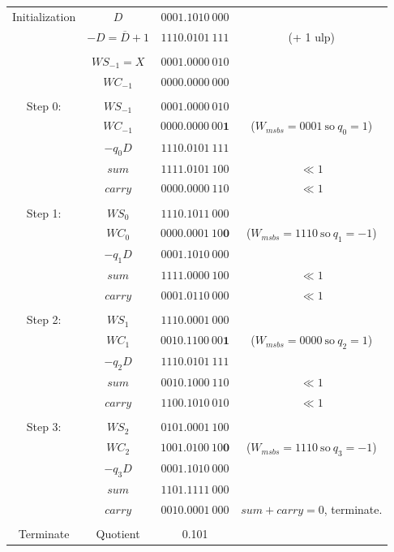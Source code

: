 \documentclass[12pt]{article}
\begin{document}
\begin{center}
\begin{tabular}{cccc}
    Initialization&$D$&$0001.1010\ 000$&\\
    &$-D=\overline{D}+1$&$1110.0101\ 111$&(+ 1 ulp)\\
    &&&\\
    &$WS_{-1}=X$&$0001.0000\ 010$&\\
    &$WC_{-1}$&$0000.0000\ 000$&\\
    \hdashline\\
    Step 0:&$WS_{-1}$&$0001.0000\ 010$&\\
    &$WC_{-1}$&$0000.0000\ 00\mathbf{1}$&($W_{msbs}=0001\ \text{so}\ q_0=1$)\\
    &$-q_0D$&$1110.0101\ 111$&\\
    \cline{2-3}
    &$sum$&$1111.0101\ 100$&$\ll1$\\
    &$carry$&$0000.0000\ 110$&$\ll1$\\
    \hdashline\\
    Step 1:&$WS_0$&$1110.1011\ 000$&\\
    &$WC_0$&$0000.0001\ 10\mathbf{0}$&($W_{msbs}=1110\ \text{so}\ q_1=-1$)\\
    &$-q_1D$&$0001.1010\ 000$&\\
    \cline{2-3}
    &$sum$&$1111.0000\ 100$&$\ll1$\\
    &$carry$&$0001.0110\ 000$&$\ll1$\\
    \hdashline\\
    Step 2:&$WS_1$&$1110.0001\ 000$&\\
    &$WC_1$&$0010.1100\ 00\mathbf{1}$&($W_{msbs}=0000\ \text{so}\ q_2=1$)\\
    &$-q_2D$&$1110.0101\ 111$&\\
    \cline{2-3}
    &$sum$&$0010.1000\ 110$&$\ll1$\\
    &$carry$&$1100.1010\ 010$&$\ll1$\\
    \hdashline\\
    Step 3:&$WS_2$&$0101.0001\ 100$&\\
    &$WC_2$&$1001.0100\ 10\mathbf{0}$&($W_{msbs}=1110\ \text{so}\ q_3=-1$)\\
    &$-q_3D$&$0001.1010\ 000$&\\
    \cline{2-3}
    &$sum$&$1101.1111\ 000$&\\
    &$carry$&$0010.0001\ 000$&$sum+carry=0$, terminate.\\
    \hdashline\\
    Terminate&Quotient&0.101
\end{tabular}
\end{center}
\end{document}
